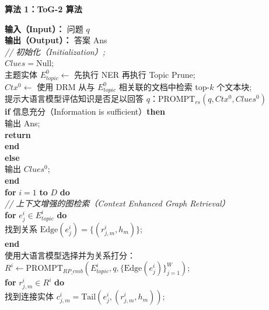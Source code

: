 \documentclass[11pt,UTF8,fontset=fandol]{ctexart}
\newcommand{\toctwo}{ToG-2}
\begin{document}
\begin{center}
\textbf{算法 1：\toctwo{} 算法}
\end{center}
\vspace{-0.5em}
\begin{algobox}
\small
\noindent\textbf{输入（Input）：} 问题 $q$\\
\noindent\textbf{输出（Output）：} 答案 Ans\\[0.3em]
\textit{// 初始化（Initialization）;}\\
$Clues=\mathrm{Null}$;\\
主题实体 $E^{0}_{topic}\leftarrow$ 先执行 NER 再执行 Topic Prune;\\
$Ctx^{0}\leftarrow$ 使用 DRM 从与 $E^{0}_{topic}$ 相关联的文档中检索 top-$k$ 个文本块;\\
提示大语言模型评估知识是否足以回答 $q$：$\mathrm{PROMPT}_{rs}(q,Ctx^{0},Clues^{0})$\\
\textbf{if} 信息充分（Information is sufficient）\textbf{then}\\
\hspace*{2em}输出 Ans;\\
\hspace*{2em}\textbf{return}\\
\textbf{end}\\
\textbf{else}\\
\hspace*{2em}输出 $Clues^{0}$;\\
\textbf{end}\\
\textbf{for} $i=1$ \textbf{to} $D$ \textbf{do}\\
\hspace*{1em}\textit{// 上下文增强的图检索（Context Enhanced Graph Retrieval）}\\
\hspace*{1em}\textbf{for} $e^{i}_{j}\in E^{i}_{topic}$ \textbf{do}\\
\hspace*{2em}找到关系 $\mathrm{Edge}(e^{i}_{j})=\{(r^{i}_{j,m},h_m)\}$;\\
\hspace*{1em}\textbf{end}\\
\hspace*{1em}使用大语言模型选择并为关系打分：$R^{i}\leftarrow\mathrm{PROMPT}_{RP\_cmb}(E^{i}_{topic},q,\{\mathrm{Edge}(e^{i}_{j})\}^{W}_{j=1})$;\\
\hspace*{1em}\textbf{for} $r^{i}_{j,m}\in R^{i}$ \textbf{do}\\
\hspace*{2em}找到连接实体 $c^{i}_{j,m}=\mathrm{Tail}(e^{i}_{j},(r^{i}_{j,m},h_m))$;\\

\end{algobox}
\end{document}
